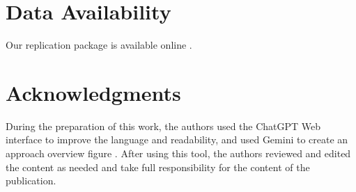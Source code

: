 \documentclass[conference]{IEEEtran}
\begin{document}
\section{Data Availability} 
Our replication package is available online \cite{compsac_replication_package}.

\section{Acknowledgments} 
 During the preparation of this work, the authors used the ChatGPT Web interface to improve the language and readability, and used Gemini to create an approach overview figure . After using this tool, the authors reviewed and edited the content as needed and take full responsibility for the content of the publication. 

%


\end{document}
